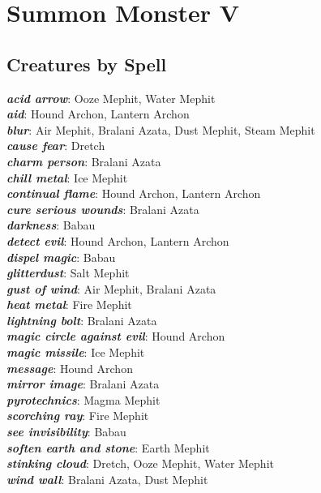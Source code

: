 \newpage

\def \levelnminustwonumsummons{1d4+1}
\def \levelnminusonenumsummons{1d3}
\def \levelnnumsummons{1}

\chapter{Summon Monster V}
\newpage

\section{Creatures by Spell}

\vspace{10pt}

\textbf{\textit{acid arrow}}: Ooze Mephit, Water Mephit \\
\textbf{\textit{aid}}: Hound Archon, Lantern Archon \\
\textbf{\textit{blur}}: Air Mephit, Bralani Azata, Dust Mephit, Steam Mephit \\
\textbf{\textit{cause fear}}: Dretch \\
\textbf{\textit{charm person}}: Bralani Azata \\
\textbf{\textit{chill metal}}: Ice Mephit \\
\textbf{\textit{continual flame}}: Hound Archon, Lantern Archon \\
\textbf{\textit{cure serious wounds}}: Bralani Azata \\
\textbf{\textit{darkness}}: Babau \\
\textbf{\textit{detect evil}}: Hound Archon, Lantern Archon \\
\textbf{\textit{dispel magic}}: Babau \\
\textbf{\textit{glitterdust}}: Salt Mephit \\
\textbf{\textit{gust of wind}}: Air Mephit, Bralani Azata \\
\textbf{\textit{heat metal}}: Fire Mephit \\
\textbf{\textit{lightning bolt}}: Bralani Azata \\
\textbf{\textit{magic circle against evil}}: Hound Archon \\
\textbf{\textit{magic missile}}: Ice Mephit \\
\textbf{\textit{message}}: Hound Archon \\
\textbf{\textit{mirror image}}: Bralani Azata \\
\textbf{\textit{pyrotechnics}}: Magma Mephit \\
\textbf{\textit{scorching ray}}: Fire Mephit \\
\textbf{\textit{see invisibility}}: Babau \\
\textbf{\textit{soften earth and stone}}: Earth Mephit \\
\textbf{\textit{stinking cloud}}: Dretch, Ooze Mephit, Water Mephit \\
\textbf{\textit{wind wall}}: Bralani Azata, Dust Mephit \\


